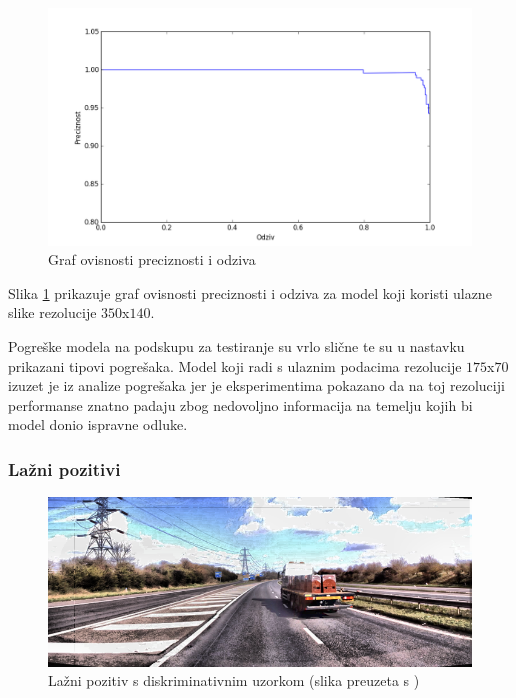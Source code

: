 \documentclass[times, utf8, diplomski, numeric]{fer}
\begin{document}
\begin{figure}[H]
\centering
\includegraphics[scale=0.55]{images/pr_350_140.png}
\caption{Graf ovisnosti preciznosti i odziva}
\label{img:pr_350_140}
\end{figure}
Slika \ref{img:pr_350_140} prikazuje graf ovisnosti preciznosti i odziva za model koji koristi ulazne slike rezolucije $350$x$140$.

Pogreške modela na podskupu za testiranje su vrlo slične te su u nastavku prikazani tipovi pogrešaka.
Model koji radi s ulaznim podacima rezolucije $175$x$70$ izuzet je iz analize pogrešaka jer je eksperimentima pokazano da na toj rezoluciji performanse znatno padaju zbog nedovoljno informacija na temelju kojih bi model donio ispravne odluke.

\subsubsection{Lažni pozitivi }

\begin{figure}[H]
\centering
\includegraphics[scale=0.5]{images/single_false_positive1.png}
\caption{Lažni pozitiv s diskriminativnim uzorkom (slika preuzeta s \citep{url:ftts_irap})}
\label{img:single_false_positive1}
\end{figure}
\end{document}
